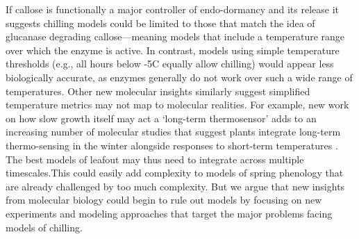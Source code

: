 \documentclass[11pt]{article}
\begin{document}
If callose is functionally a major controller of endo-dormancy and its release it suggests chilling models could be limited to those that match the idea of glucanase degrading callose---meaning models that include a temperature range over which the enzyme is active. In contrast, models using simple temperature thresholds (e.g., all hours below -5\degree C equally allow chilling) would appear less biologically accurate, as enzymes generally do not work over such a wide range of temperatures. Other new molecular insights similarly suggest simplified temperature metrics may not map to molecular realities. For example, new work on how slow growth itself may act  a `long-term thermosensor' \citep{zhao2020temperature} adds to an increasing number of molecular studies that suggest plants integrate long-term thermo-sensing in the winter alongside responses to short-term temperatures \citep{antoniou2021feeling,Satake2022}. The best models of leafout may thus need to integrate across multiple timescales.This could easily add complexity to models of spring phenology that are already challenged by too much complexity. But we argue that new insights from molecular biology could begin to rule out models by focusing on new experiments and modeling approaches that target the major problems facing models of chilling. %


\end{document}
